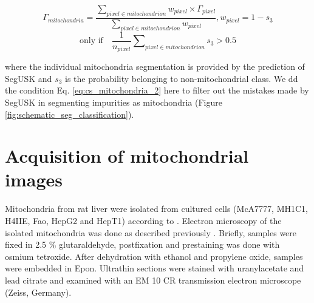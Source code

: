    \begin{equation}
          \label{eq:cs_mitochondria}
              \Gamma_{mitochondria} =  \frac{\sum_{pixel \in mitochondrion} w_{pixel} \times \Gamma_{pixel}}{\sum_{pixel \in mitochondrion} w_{pixel}} , w_{pixel} = 1 - s_3
     \end{equation}
        \begin{equation}
          \label{eq:cs_mitochondria_2}
    \textrm {only if} \hspace{1em} \frac{1}{n_{pixel}} \sum \nolimits_{pixel \in mitochondrion} s_3 > 0.5
     \end{equation}
     
where the individual mitochondria segmentation is provided by the prediction
of SegUSK and $s_3$ is the probability belonging to non-mitochondrial class. We
dd the condition Eq. \ref{eq:cs_mitochondria_2} here to filter out the mistakes made by SegUSK in
segmenting impurities as mitochondria (Figure \ref{fig:schematic_seg_classification}).

\section{Acquisition of mitochondrial images}
Mitochondria from rat liver were isolated from cultured cells (McA7777, MH1C1,
H4IIE, Fao, HepG2 and HepT1) according to \cite{Schulz2015} . Electron microscopy
of the isolated mitochondria was done as described previously \cite{Schmitt2015}. Briefly, samples
were fixed in 2.5 $\%$ glutaraldehyde, postfixation and prestaining was done with
osmium tetroxide. After dehydration with ethanol and propylene oxide, samples were
embedded in Epon. Ultrathin sections were stained with uranylacetate and lead citrate
and examined with an EM 10 CR transmission electron microscope (Zeiss,
Germany). \\

